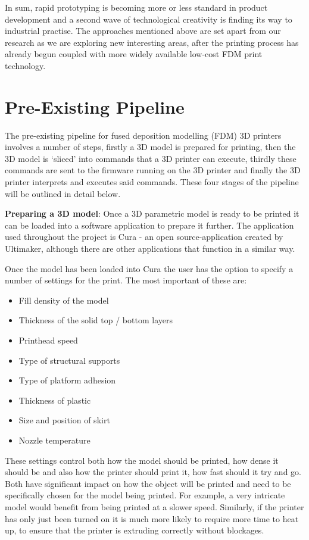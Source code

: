 \documentclass[11pt]{report} %
\begin{document}
In sum, rapid prototyping is becoming more or less standard in product development and a second wave of technological creativity is finding its way to industrial practise. The approaches mentioned above are set apart from our research as we are exploring new interesting areas, after the printing process has already begun coupled with more widely available low-cost FDM print technology. 




\section{Pre-Existing Pipeline}
\label{section:PreExistingPipeline}
The pre-existing pipeline for fused deposition modelling (FDM) 3D printers involves a number of steps, firstly a 3D model is prepared for printing, then the 3D model is `sliced' into commands that a 3D printer can execute, thirdly these commands are sent to the firmware running on the 3D printer and finally the 3D printer interprets and executes said commands. These four stages of the pipeline will be outlined in detail below. 

\textbf{Preparing a 3D model}: Once a 3D parametric model is ready to be printed it can be loaded into a software application to prepare it further. The application used throughout the project is Cura - an open source-application created by Ultimaker, although there are other applications that function in a similar way.

Once the model has been loaded into Cura the user has the option to specify a number of settings for the print. The most important of these are:

\begin{itemize}
\item Fill density of the model
\item Thickness of the solid top / bottom layers
\item Printhead speed
\item Type of structural supports
\item Type of platform adhesion
\item Thickness of plastic
\item Size and position of skirt
\item Nozzle temperature
\end{itemize}

These settings control both how the model should be printed, how dense it should be and also how the printer should print it, how fast should it try and go. Both have significant impact on how the object will be printed and need to be specifically chosen for the model being printed. For example, a very intricate model would benefit from being printed at a slower speed. Similarly, if the printer has only just been turned on it is much more likely to require more time to heat up, to ensure that the printer is extruding correctly without blockages.
\end{document}
